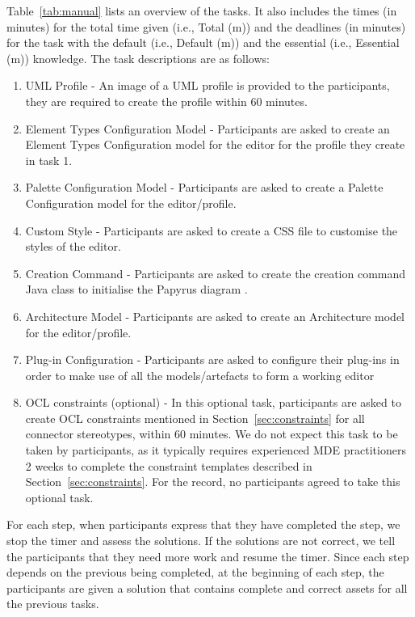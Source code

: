 Table~\ref{tab:manual} lists an overview of the tasks. It also includes the times (in minutes) for the total time given (i.e., Total (m))  and the deadlines (in minutes) for the task with the default (i.e., Default (m)) and the essential (i.e., Essential (m)) knowledge.
The task descriptions are as follows:
\begin{enumerate}
	\item UML Profile - An image of a UML profile is provided to the participants, they are required to create the profile within 60 minutes.
	\item Element Types Configuration Model - Participants are asked to create an Element Types Configuration model for the editor for the profile they create in task 1.
	\item Palette Configuration Model - Participants are asked to create a Palette Configuration model for the editor/profile.
	\item Custom Style - Participants are asked to create a CSS file to customise the styles of the editor.
	\item Creation Command - Participants are asked to create the creation command Java class to initialise the Papyrus diagram .
	\item Architecture Model - Participants are asked to create an Architecture model for the editor/profile.
	\item Plug-in Configuration - Participants are asked to configure their plug-ins in order to make use of all the models/artefacts to form a working editor
	\item OCL constraints (optional) - In this optional task, participants are asked to create OCL constraints mentioned in Section~\ref{sec:constraints} for all connector stereotypes, within 60 minutes. 
	We do not expect this task to be taken by participants, as it typically requires experienced MDE practitioners 2 weeks to complete the constraint templates described in Section~\ref{sec:constraints}.
	For the record, no participants agreed to take this optional task.
\end{enumerate}

For each step, when participants express that they have completed the step, we stop the timer and assess the solutions. 
If the solutions are not correct, we tell the participants that they need more work and resume the timer. 
Since each step depends on the previous being completed, at the beginning of each step, the participants are given a solution that contains complete and correct assets for all the previous tasks.

